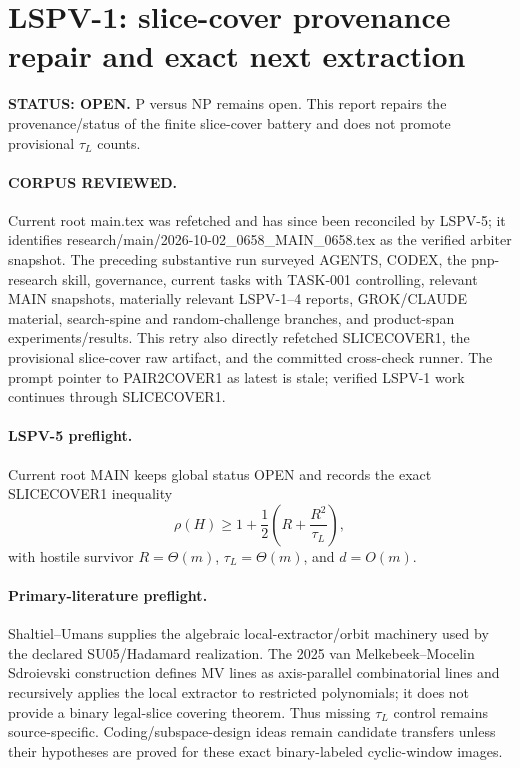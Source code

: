 \documentclass[11pt]{article}
\begin{document}
\section*{LSPV-1: slice-cover provenance repair and exact next extraction}
\textbf{STATUS: OPEN.} P versus NP remains open. This report repairs the provenance/status of the finite slice-cover battery and does not promote provisional $\tau_L$ counts.

\paragraph{CORPUS REVIEWED.}
Current root main.tex was refetched and has since been reconciled by LSPV-5; it identifies research/main/2026-10-02_0658_MAIN_0658.tex as the verified arbiter snapshot. The preceding substantive run surveyed AGENTS, CODEX, the pnp-research skill, governance, current tasks with TASK-001 controlling, relevant MAIN snapshots, materially relevant LSPV-1--4 reports, GROK/CLAUDE material, search-spine and random-challenge branches, and product-span experiments/results. This retry also directly refetched SLICECOVER1, the provisional slice-cover raw artifact, and the committed cross-check runner. The prompt pointer to PAIR2COVER1 as latest is stale; verified LSPV-1 work continues through SLICECOVER1.

\paragraph{LSPV-5 preflight.}
Current root MAIN keeps global status OPEN and records the exact SLICECOVER1 inequality
\[\rho(H)\ge1+\frac12\left(R+\frac{R^2}{\tau_L}\right),\]
with hostile survivor $R=\Theta(m)$, $\tau_L=\Theta(m)$, and $d=O(m)$.

\paragraph{Primary-literature preflight.}
Shaltiel--Umans supplies the algebraic local-extractor/orbit machinery used by the declared SU05/Hadamard realization. The 2025 van Melkebeek--Mocelin Sdroievski construction defines MV lines as axis-parallel combinatorial lines and recursively applies the local extractor to restricted polynomials; it does not provide a binary legal-slice covering theorem. Thus missing $\tau_L$ control remains source-specific. Coding/subspace-design ideas remain candidate transfers unless their hypotheses are proved for these exact binary-labeled cyclic-window images.
\end{document}
